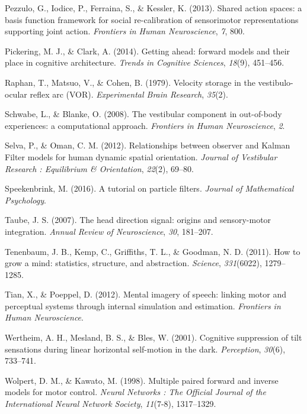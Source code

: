 \documentclass[english,floatsintext,man]{apa6}
\theoremstyle{definition}
\theoremstyle{definition}
\theoremstyle{remark}
\begin{document}
\hypertarget{ref-Pezzulo:2013iy}{}
Pezzulo, G., Iodice, P., Ferraina, S., \& Kessler, K. (2013). Shared
action spaces: a basis function framework for social re-calibration of
sensorimotor representations supporting joint action. \emph{Frontiers in
Human Neuroscience}, \emph{7}, 800.

\hypertarget{ref-Pickering:2014bo}{}
Pickering, M. J., \& Clark, A. (2014). Getting ahead: forward models and
their place in cognitive architecture. \emph{Trends in Cognitive
Sciences}, \emph{18}(9), 451--456.

\hypertarget{ref-Raphan:1979hn}{}
Raphan, T., Matsuo, V., \& Cohen, B. (1979). Velocity storage in the
vestibulo-ocular reflex arc (VOR). \emph{Experimental Brain Research},
\emph{35}(2).

\hypertarget{ref-Schwabe:2008ho}{}
Schwabe, L., \& Blanke, O. (2008). The vestibular component in
out-of-body experiences: a computational approach. \emph{Frontiers in
Human Neuroscience}, \emph{2}.

\hypertarget{ref-Selva:2012gsa}{}
Selva, P., \& Oman, C. M. (2012). Relationships between observer and
Kalman Filter models for human dynamic spatial orientation.
\emph{Journal of Vestibular Research : Equilibrium \& Orientation},
\emph{22}(2), 69--80.

\hypertarget{ref-Speekenbrink:2016kc}{}
Speekenbrink, M. (2016). A tutorial on particle filters. \emph{Journal
of Mathematical Psychology}.

\hypertarget{ref-Taube:2007fk}{}
Taube, J. S. (2007). The head direction signal: origins and
sensory-motor integration. \emph{Annual Review of Neuroscience},
\emph{30}, 181--207.

\hypertarget{ref-Tenenbaum:2011hd}{}
Tenenbaum, J. B., Kemp, C., Griffiths, T. L., \& Goodman, N. D. (2011).
How to grow a mind: statistics, structure, and abstraction.
\emph{Science}, \emph{331}(6022), 1279--1285.

\hypertarget{ref-Tian:2012ui}{}
Tian, X., \& Poeppel, D. (2012). Mental imagery of speech: linking motor
and perceptual systems through internal simulation and estimation.
\emph{Frontiers in Human Neuroscience}.

\hypertarget{ref-Wertheim:2001cb}{}
Wertheim, A. H., Mesland, B. S., \& Bles, W. (2001). Cognitive
suppression of tilt sensations during linear horizontal self-motion in
the dark. \emph{Perception}, \emph{30}(6), 733--741.

\hypertarget{ref-Wolpert:1998td}{}
Wolpert, D. M., \& Kawato, M. (1998). Multiple paired forward and
inverse models for motor control. \emph{Neural Networks : The Official
Journal of the International Neural Network Society}, \emph{11}(7-8),
1317--1329.


\clearpage
\renewcommand{\listtablename}{Table captions}
\listoftables

\clearpage
\renewcommand{\listfigurename}{Figure captions}
\listoffigures
\end{document}
